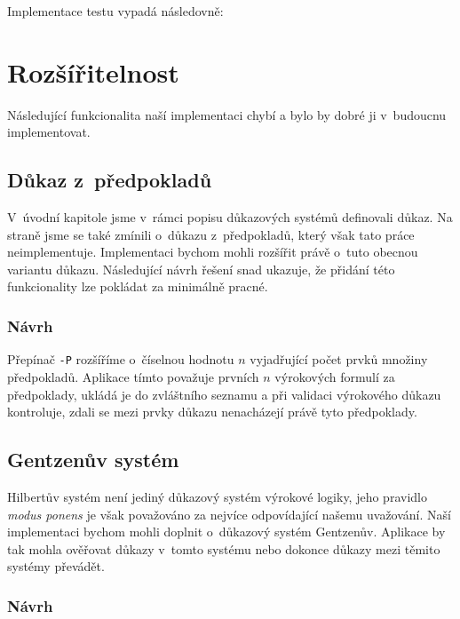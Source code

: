 \documentclass[thesis=B,czech,hidelinks]{FITthesis}[2012/06/26]
\begin{document}
Implementace testu vypadá následovně:

\begin{center}

\end{center}

%
%
%

\chapter{Rozšířitelnost}

Následující funkcionalita naší implementaci chybí a bylo by dobré ji v~budoucnu implementovat.

\section{Důkaz z~předpokladů}

V~úvodní kapitole jsme v~rámci popisu důkazových systémů definovali důkaz. Na straně \pageref{sec:dzp} jsme se také zmínili o~důkazu z~předpokladů, který však tato práce neimplementuje. Implementaci bychom mohli rozšířit právě o~tuto obecnou variantu důkazu. Následující návrh řešení snad ukazuje, že přidání této funkcionality lze pokládat za minimálně pracné.

\subsection{Návrh}

Přepínač \texttt{-P} rozšíříme o~číselnou hodnotu $n$ vyjadřující počet prvků množiny předpokladů. Aplikace tímto považuje prvních $n$ výrokových formulí za předpoklady, ukládá je do zvláštního seznamu a při validaci výrokového důkazu kontroluje, zdali se mezi prvky důkazu nenacházejí právě tyto předpoklady.

\section{Gentzenův systém}

Hilbertův systém není jediný důkazový systém výrokové logiky, jeho pravidlo \emph{modus ponens} je však považováno za nejvíce odpovídající našemu uvažování. Naší implementaci bychom mohli doplnit o~důkazový systém Gentzenův. Aplikace by tak mohla ověřovat důkazy v~tomto systému nebo dokonce důkazy mezi těmito systémy převádět.

\subsection{Návrh}
\end{document}
